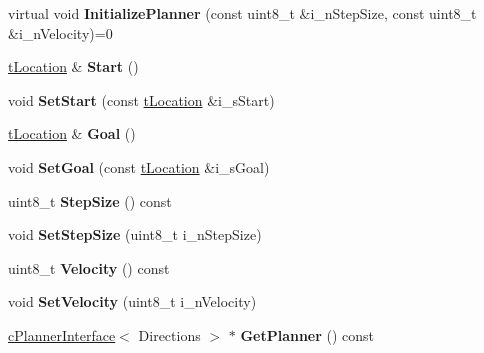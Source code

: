\begin{DoxyCompactItemize}
\item 
\mbox{\label{classplanner_1_1c_rover_interface_ad71ed53d130011d7c9ff2588d8e588ce}} 
virtual void {\bfseries Initialize\+Planner} (const uint8\+\_\+t \&i\+\_\+n\+Step\+Size, const uint8\+\_\+t \&i\+\_\+n\+Velocity)=0
\item 
\mbox{\label{classplanner_1_1c_rover_interface_ad62c6dcbe7c8194c6a93ca1fc29ee4b8}} 
\mbox{\hyperlink{structplanner_1_1t_location}{t\+Location}} \& {\bfseries Start} ()
\item 
\mbox{\label{classplanner_1_1c_rover_interface_a29669ceb2b1f4cebf0953b59e3c8936a}} 
void {\bfseries Set\+Start} (const \mbox{\hyperlink{structplanner_1_1t_location}{t\+Location}} \&i\+\_\+s\+Start)
\item 
\mbox{\label{classplanner_1_1c_rover_interface_a5a02ffb5e04d128bf81567da55807850}} 
\mbox{\hyperlink{structplanner_1_1t_location}{t\+Location}} \& {\bfseries Goal} ()
\item 
\mbox{\label{classplanner_1_1c_rover_interface_a8f0e30cf351e8cb7ba75622273056343}} 
void {\bfseries Set\+Goal} (const \mbox{\hyperlink{structplanner_1_1t_location}{t\+Location}} \&i\+\_\+s\+Goal)
\item 
\mbox{\label{classplanner_1_1c_rover_interface_a1caf2c84041f16aa7f5c5f633fcb9902}} 
uint8\+\_\+t {\bfseries Step\+Size} () const
\item 
\mbox{\label{classplanner_1_1c_rover_interface_ae99f1fe61fa1a88164913166a1af0ff4}} 
void {\bfseries Set\+Step\+Size} (uint8\+\_\+t i\+\_\+n\+Step\+Size)
\item 
\mbox{\label{classplanner_1_1c_rover_interface_a7618e5fa25b630fa2c11110d3da87e0c}} 
uint8\+\_\+t {\bfseries Velocity} () const
\item 
\mbox{\label{classplanner_1_1c_rover_interface_a30f7e856b79e9ad2230b2faccd65a8ff}} 
void {\bfseries Set\+Velocity} (uint8\+\_\+t i\+\_\+n\+Velocity)
\item 
\mbox{\label{classplanner_1_1c_rover_interface_a5a4d39a81f9fac046411fa2f70986b96}} 
\mbox{\hyperlink{classplanner_1_1c_planner_interface}{c\+Planner\+Interface}}$<$ Directions $>$ $\ast$ {\bfseries Get\+Planner} () const
\end{DoxyCompactItemize}
